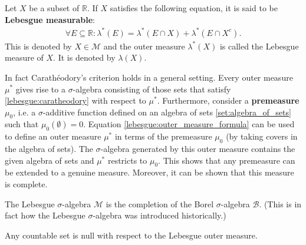    \begin{theorem}\label{lebesgue:lebesgue_measure}
        Let $X$ be a subset of $\mathbb{R}$. If $X$ satisfies the following equation, it is said to be \textbf{Lebesgue measurable}:
        \begin{gather}
            \label{lebesgue:caratheodory}
            \forall E\subseteq\mathbb{R}:\lambda^*(E) = \lambda^*(E\cap X) + \lambda^*(E\cap X^c).
        \end{gather}
        This is denoted by $X\in\mathcal{M}$ and the outer measure $\lambda^*(X)$ is called the Lebesgue measure of $X$. It is denoted by $\lambda(X)$.
    \end{theorem}
    \begin{construct}\label{lebesgue:extension_theorem}
        In fact Carath\'eodory's criterion holds in a general setting. Every outer measure $\mu^*$ gives rise to a $\sigma$-algebra consisting of those sets that satisfy \eqref{lebesgue:caratheodory} with respect to $\mu^*$. Furthermore, consider a \textbf{premeasure} $\mu_0$, i.e. a $\sigma$-additive function defined on an algebra of sets \ref{set:algebra_of_sets} such that $\mu_0(\emptyset) = 0$. Equation \eqref{lebesgue:outer_measure_formula} can be used to define an outer measure $\mu^*$ in terms of the premeasure $\mu_0$ (by taking covers in the algebra of sets). The $\sigma$-algebra generated by this outer measure contains the given algebra of sets and $\mu^*$ restricts to $\mu_0$. This shows that any premeasure can be extended to a genuine measure. Moreover, it can be shown that this measure is complete.
    \end{construct}
    \begin{result}\label{lebesgue:completion_remark}
        The Lebesgue $\sigma$-algebra $\mathcal{M}$ is the completion of the Borel $\sigma$-algebra $\mathcal{B}$. (This is in fact how the Lebesgue $\sigma$-algebra was introduced historically.)
    \end{result}

    \begin{property}\label{lebesgue:theorem:countable_set_is_null}
        Any countable set is null with respect to the Lebesgue outer measure.
    \end{property}

